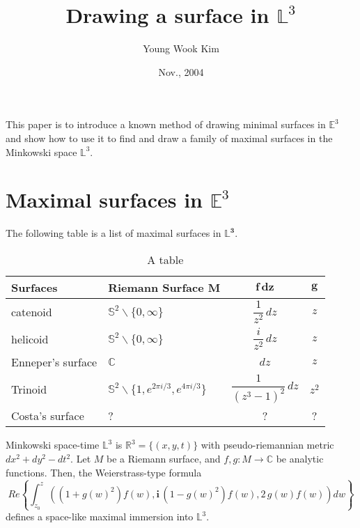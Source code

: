 \documentclass[11pt]{article}
\begin{document}
\title{Drawing a surface in $\mathbb{L}^3$}
\author{Young Wook Kim}
\date{Nov., 2004}

\maketitle

This paper is to introduce a known method of 
drawing minimal surfaces in $\mathbb{E}^3$ and show
how to use it to find and draw a family of maximal 
surfaces in the Minkowski space $\mathbb{L}^3$. 



\section{Maximal surfaces in $\mathbb{E}^3$}
The following table is a list of
maximal surfaces in $\boldsymbol{\mathbb{L}^3}$.


\renewcommand{\arraystretch}{2}
\begin{table}[h]
\begin{center}
\begin{tabular}{|l|l|c|c|}
\hline
    \textbf{Surfaces} & \textbf{Riemann Surface} $\boldsymbol{M}$ 
    & $\boldsymbol{f\,dz}$ & $\boldsymbol{g}$ \\
\hline\hline
    catenoid & $\mathbb{S}^2\smallsetminus\{ 0 , \infty \}$ 
    & $\dfrac{1}{z^2}\,dz$ & $z$ \\
\hline
    helicoid & $\mathbb{S}^2\smallsetminus\{ 0 , \infty \}$ 
    & $\dfrac{i}{z^2}\,dz$ & $z$ \\
\hline
    Enneper's surface & $\mathbb{C}$         & $dz$            & $z$ \\
\hline
    Trinoid  & $\mathbb{S}^2  
    \smallsetminus \{1, e^{2\pi i / 3}, e^{4\pi i / 3}  \}$
        & $\dfrac{1}{(z^3-1)^2}\,dz$ & $z^2$ \\
\hline
    Costa's surface & {?} & {?} 
    & {?}  \\
\hline
\end{tabular}
\end{center}
\caption{A table}
\end{table}




Minkowski space-time $\mathbb{L}^3$ is $\mathbb{R}^3=\{(x,y,t)\}$ with 
pseudo-riemannian metric $dx^2+dy^2-dt^2$.
Let $M$ be a Riemann surface, and $f,g: M \rightarrow \mathbb{C}$ be 
analytic functions. Then, the Weierstrass-type formula
\begin{equation*}
    Re \left\{ \int_{z_0}^z 
    \left( (1+g(w)^2) f(w), {\boldsymbol{i}}\,( 1-g(w)^2) f(w) , 
    2\,g(w)f(w) \right) dw \right\}
\end{equation*}
defines a {space-like} maximal immersion into $\mathbb{L}^3$.
\end{document}
